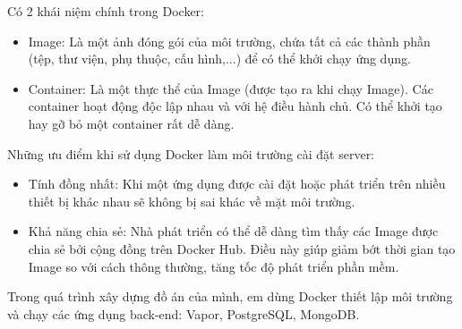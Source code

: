\documentclass[../DoAn.tex]{subfiles}
\begin{document}
Có 2 khái niệm chính trong Docker: 
\begin{itemize}
    \item Image: Là một ảnh đóng gói của môi trường, chứa tất cả các thành phần (tệp, thư viện, phụ thuộc, cấu hình,...) để có thể khởi chạy ứng dụng.
    \item Container: Là một thực thể của Image (được tạo ra khi chạy Image). Các container hoạt động độc lập nhau và với hệ điều hành chủ. Có thể khởi tạo hay gỡ bỏ một container rất dễ dàng.
\end{itemize}

Những ưu điểm khi sử dụng Docker làm môi trường cài đặt server:
\begin{itemize}
    \item Tính đồng nhất: Khi một ứng dụng được cài đặt hoặc phát triển trên nhiều thiết bị khác nhau sẽ không bị sai khác về mặt môi trường.
    \item Khả năng chia sẻ: Nhà phát triển có thể dễ dàng tìm thấy các Image được chia sẻ bởi cộng đồng trên Docker Hub. Điều này giúp giảm bớt thời gian tạo Image so với cách thông thường, tăng tốc độ phát triển phần mềm.
\end{itemize}

Trong quá trình xây dựng đồ án của mình, em dùng Docker thiết lập môi trường và chạy các ứng dụng back-end: Vapor, PostgreSQL, MongoDB.







\end{document}
